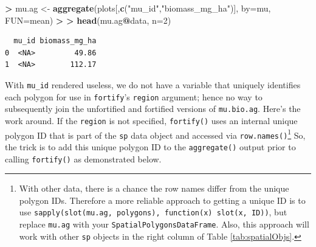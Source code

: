 \documentclass[
]{krantz}
\makeatletter
\newenvironment{Shaded}{\begin{snugshade}}{\end{snugshade}}
\newcommand{\DataTypeTok}[1]{\textcolor[rgb]{0.27,0.27,0.27}{#1}}
\newcommand{\DecValTok}[1]{\textcolor[rgb]{0.06,0.06,0.06}{#1}}
\newcommand{\ErrorTok}[1]{\textcolor[rgb]{0.14,0.14,0.14}{\textbf{#1}}}
\newcommand{\KeywordTok}[1]{\textcolor[rgb]{0.27,0.27,0.27}{\textbf{#1}}}
\newcommand{\NormalTok}[1]{#1}
\newcommand{\OperatorTok}[1]{\textcolor[rgb]{0.43,0.43,0.43}{\textbf{#1}}}
\newcommand{\StringTok}[1]{\textcolor[rgb]{0.5,0.5,0.5}{#1}}
\newenvironment{kframe}{%
\medskip{}
\setlength{\fboxsep}{.8em}
 \def\at@end@of@kframe{}%
 \ifinner\ifhmode%
  \def\at@end@of@kframe{\end{minipage}}%
  \begin{minipage}{\columnwidth}%
 \fi\fi%
 \def\FrameCommand##1{\hskip\@totalleftmargin \hskip-\fboxsep
 \colorbox{shadecolor}{##1}\hskip-\fboxsep
     \hskip-\linewidth \hskip-\@totalleftmargin \hskip\columnwidth}%
 \MakeFramed {\advance\hsize-\width
   \@totalleftmargin\z@ \linewidth\hsize
   \@setminipage}}%
 {\par\unskip\endMakeFramed%
 \at@end@of@kframe}
\renewenvironment{Shaded}{\begin{kframe}}{\end{kframe}}
\makeatother
\begin{document}
\begin{Shaded}
\begin{Highlighting}[]
\OperatorTok{\textgreater{}}\StringTok{ }\NormalTok{mu.ag \textless{}{-}}\StringTok{ }\KeywordTok{aggregate}\NormalTok{(plots[,}\KeywordTok{c}\NormalTok{(}\StringTok{"mu\_id"}\NormalTok{,}\StringTok{"biomass\_mg\_ha"}\NormalTok{)], }\DataTypeTok{by=}\NormalTok{mu, }\DataTypeTok{FUN=}\NormalTok{mean)}
\OperatorTok{\textgreater{}}\StringTok{ }
\ErrorTok{\textgreater{}}\StringTok{ }\KeywordTok{head}\NormalTok{(mu.ag}\OperatorTok{@}\NormalTok{data, }\DataTypeTok{n=}\DecValTok{2}\NormalTok{)}
\end{Highlighting}
\end{Shaded}

\begin{verbatim}
  mu_id biomass_mg_ha
0  <NA>         49.86
1  <NA>        112.17
\end{verbatim}

With \texttt{mu\_id} rendered useless, we do not have a variable that uniquely identifies each polygon for use in \texttt{fortify}'s \texttt{region} argument; hence no way to subsequently join the unfortified and fortified versions of \texttt{mu.bio.ag}. Here's the work around. If the \texttt{region} is not specified, \texttt{fortify()} uses an internal unique polygon ID that is part of the \texttt{sp} data object and accessed via \texttt{row.names()}\footnote{With other data, there is a chance the row names differ from the unique polygon IDs. Therefore a more reliable approach to getting a unique ID is to use \texttt{sapply(slot(mu.ag,\ \textquotesingle{}polygons\textquotesingle{}),\ function(x)\ slot(x,\ \textquotesingle{}ID\textquotesingle{}))}, but replace \texttt{mu.ag} with your \texttt{SpatialPolygonsDataFrame}. Also, this approach will work with other \texttt{sp} objects in the right column of Table \ref{tab:spatialObjs}.} So, the trick is to add this unique polygon ID to the \texttt{aggregate()} output prior to calling \texttt{fortify()} as demonstrated below.

\begin{Shaded}
\end{Shaded}
\end{document}
